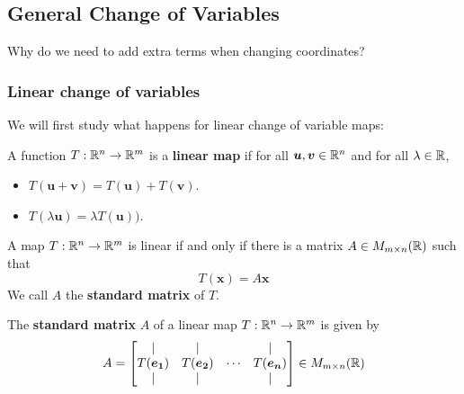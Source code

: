 \subsection{General Change of Variables}

\begin{motivating}
    Why do we need to add extra terms when changing coordinates?
\end{motivating}

\subsubsection{Linear change of variables}

We will first study what happens for linear change of variable maps:


\begin{proposition}
     A function $T : \mathbb{R}^n \to \mathbb{R}^m$ is a \textbf{linear map} if  for all $\bm{u}, \bm{v} \in \mathbb{R}^n$ and for all $\lambda \in \mathbb{R}$,
     
     \begin{itemize}
        \item $T(\bm{u} + \bm{v}) = T(\bm{u}) + T(\bm{v})$.
        \item $T(\lambda \bm{u}) = \lambda T(\bm{u}))$.
    \end{itemize}
    \end{proposition}

\begin{theorem}
    A map $T: \mathbb{R}^n \to \mathbb{R}^m$ is linear if and only if there is a matrix $A \in M_{m \times n}(\mathbb{R})$ such that $$T(\bm{x}) = A\bm{x}$$  
    We call $A$ the \textbf{standard matrix} of $T$.
    \end{theorem}
    
\begin{definition}
    The \textbf{standard matrix} $A$ of a linear map $T: \mathbb{R}^n \to \mathbb{R}^m$ is given by
    \begin{equation*}
A = 
\begin{bmatrix}
\vert & \vert & & \vert \\
    T(\bm{e_1})   & T(\bm{e_2}) & \cdots & T(\bm{e_n})  \\
    \vert & \vert & & \vert
\end{bmatrix} \in M_{m \times n}(\mathbb{R})
\end{equation*}
\end{definition}


